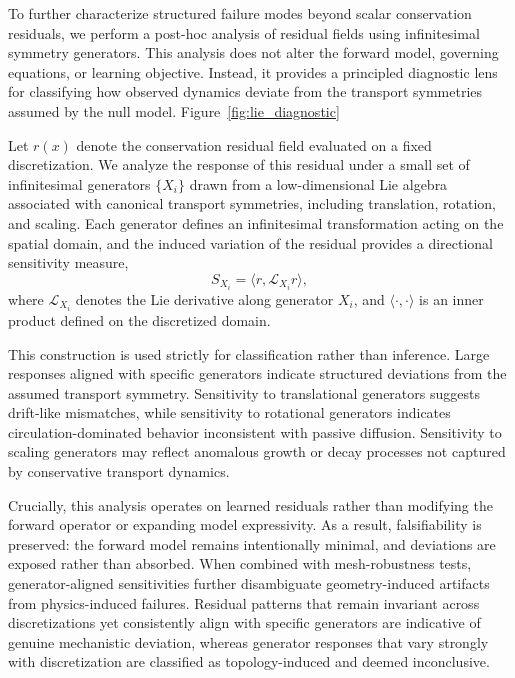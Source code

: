 \documentclass[10pt,article]{article}
\begin{document}
To further characterize structured failure modes beyond scalar conservation residuals, we perform a post-hoc analysis of residual fields using infinitesimal symmetry generators. This analysis does not alter the forward model, governing equations, or learning objective. Instead, it provides a principled diagnostic lens for classifying how observed dynamics deviate from the transport symmetries assumed by the null model. Figure~\ref{fig:lie_diagnostic}

Let $r(x)$ denote the conservation residual field evaluated on a fixed discretization. We analyze the response of this residual under a small set of infinitesimal generators $\{X_i\}$ drawn from a low-dimensional Lie algebra associated with canonical transport symmetries, including translation, rotation, and scaling. Each generator defines an infinitesimal transformation acting on the spatial domain, and the induced variation of the residual provides a directional sensitivity measure,
\begin{equation}
S_{X_i} = \langle r, \mathcal{L}_{X_i} r \rangle,
\end{equation}
where $\mathcal{L}_{X_i}$ denotes the Lie derivative along generator $X_i$, and $\langle \cdot, \cdot \rangle$ is an inner product defined on the discretized domain.

This construction is used strictly for classification rather than inference. Large responses aligned with specific generators indicate structured deviations from the assumed transport symmetry. Sensitivity to translational generators suggests drift-like mismatches, while sensitivity to rotational generators indicates circulation-dominated behavior inconsistent with passive diffusion. Sensitivity to scaling generators may reflect anomalous growth or decay processes not captured by conservative transport dynamics.

Crucially, this analysis operates on learned residuals rather than modifying the forward operator or expanding model expressivity. As a result, falsifiability is preserved: the forward model remains intentionally minimal, and deviations are exposed rather than absorbed. When combined with mesh-robustness tests, generator-aligned sensitivities further disambiguate geometry-induced artifacts from physics-induced failures. Residual patterns that remain invariant across discretizations yet consistently align with specific generators are indicative of genuine mechanistic deviation, whereas generator responses that vary strongly with discretization are classified as topology-induced and deemed inconclusive.
\end{document}
